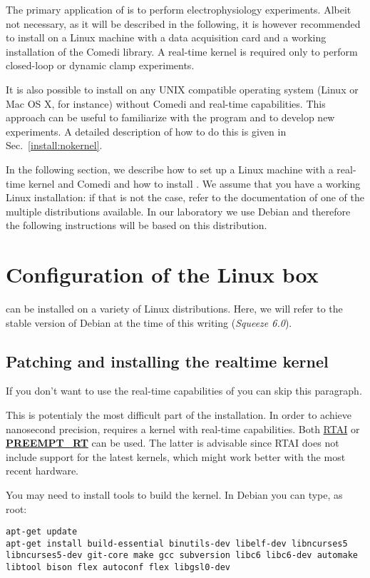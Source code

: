 The primary application of \progname is to perform electrophysiology
experiments. Albeit not necessary, as it will be described in the
following, it is however recommended to install \progname on a Linux
machine with a data acquisition card and a working installation of the
Comedi library. A real-time kernel is required only to perform
closed-loop or dynamic clamp experiments.

It is also possible to install \progname on any UNIX compatible
operating system (Linux or Mac OS X, for instance) without Comedi and
real-time capabilities. This approach can be useful to familiarize
with the program and to develop new experiments. A detailed
description of how to do this is given in Sec.~\ref{install:nokernel}.

In the following section, we describe how to set up a Linux machine
with a real-time kernel and Comedi and how to install \progname. We
assume that you have a working Linux installation: if that is not the
case, refer to the documentation of one of the multiple distributions
available. In our laboratory we use Debian and therefore the
following instructions will be based on this distribution.

\section{Configuration of the Linux box}
\progname can be installed on a variety of Linux distributions. Here,
we will refer to the stable version of Debian at the time of this
writing (\emph{Squeeze 6.0}).

\subsection{Patching and installing the realtime kernel}
If you don't want to use the real-time capabilities of \progname you
can skip this paragraph.

This is potentialy the most difficult part of the installation. In
order to achieve nanosecond precision, \progname requires a kernel
with real-time capabilities. Both \href{http://www.rtai.org}{RTAI} or
\textbf{\href{https://rt.wiki.kernel.org/index.php/Main\_Page}{PREEMPT\_RT}}
can be used. The latter is advisable since RTAI does not include
support for the latest kernels, which might work better with the most
recent hardware.

You may need to install tools to build the kernel. In Debian you can
type, as root:
\begin{lstlisting}
apt-get update
apt-get install build-essential binutils-dev libelf-dev libncurses5
libncurses5-dev git-core make gcc subversion libc6 libc6-dev automake
libtool bison flex autoconf flex libgsl0-dev 
\end{lstlisting}

